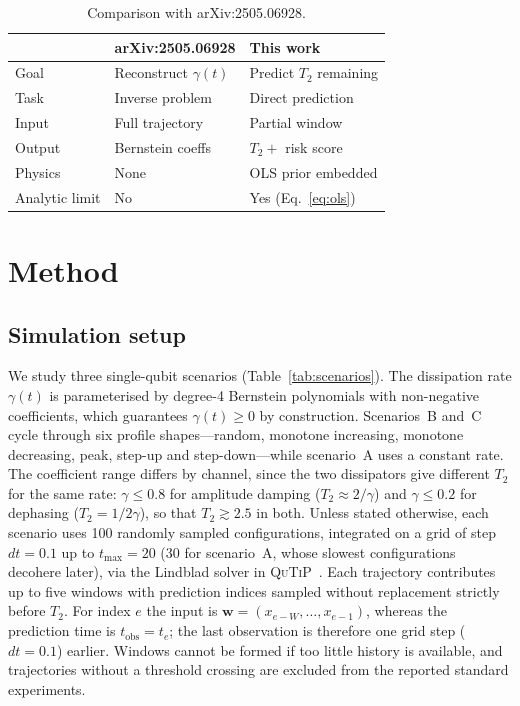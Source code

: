 \documentclass[twocolumn,10pt]{article}
\begin{document}
\begin{table}[h]
\centering
\caption{Comparison with arXiv:2505.06928.\label{tab:comparison}}
\small
\begin{tabular}{p{2cm}p{2.2cm}p{2.2cm}}
\toprule
 & arXiv:2505.06928 & \textbf{This work} \\
\midrule
Goal        & Reconstruct $\gamma(t)$ & Predict $T_2$ remaining \\
Task        & Inverse problem         & Direct prediction \\
Input       & Full trajectory         & Partial window \\
Output      & Bernstein coeffs        & $T_2 +$ risk score \\
Physics     & None                    & OLS prior embedded \\
Analytic limit & No & Yes (Eq.~\ref{eq:ols}) \\
\bottomrule
\end{tabular}
\end{table}

\section{Method}

\subsection{Simulation setup}
\label{sec:sim}

We study three single-qubit scenarios (Table~\ref{tab:scenarios}).
The dissipation rate $\gamma(t)$ is parameterised by degree-4 Bernstein
polynomials with non-negative coefficients, which guarantees
$\gamma(t) \geq 0$ by construction.
Scenarios~B and~C cycle through six profile shapes---random, monotone
increasing, monotone decreasing, peak, step-up and step-down---while
scenario~A uses a constant rate.
The coefficient range differs by channel, since the two dissipators give
different $T_2$ for the same rate: $\gamma \leq 0.8$ for amplitude
damping ($T_2 \approx 2/\gamma$) and $\gamma \leq 0.2$ for dephasing
($T_2 = 1/2\gamma$), so that $T_2 \gtrsim 2.5$ in both.
Unless stated otherwise, each scenario uses 100 randomly sampled configurations, integrated on a
grid of step $dt = 0.1$ up to $t_\mathrm{max} = 20$ ($30$ for
scenario~A, whose slowest configurations decohere later), via the
Lindblad solver in \textsc{QuTiP}~\cite{qutip}.
Each trajectory contributes up to five windows with prediction indices sampled
without replacement strictly before $T_2$. For index $e$ the input is
$\mathbf w=(x_{e-W},\ldots,x_{e-1})$, whereas the prediction time is
$t_\mathrm{obs}=t_e$; the last observation is therefore one grid step
($dt=0.1$) earlier. Windows cannot be formed if too little history is
available, and trajectories without a threshold crossing are excluded from
the reported standard experiments.
\end{document}
